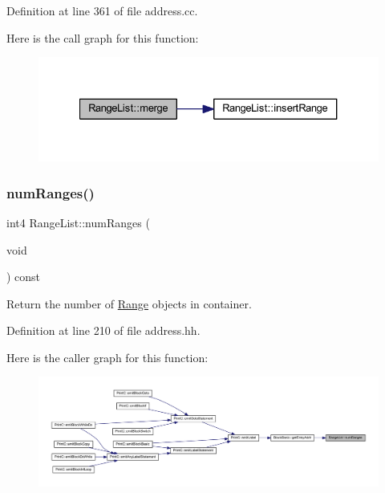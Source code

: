 Definition at line 361 of file address.\+cc.

Here is the call graph for this function\+:
\nopagebreak
\begin{figure}[H]
\begin{center}
\leavevmode
\includegraphics[width=327pt]{class_range_list_abdacecedb9b17b6a1b67f3f3d1d192e2_cgraph}
\end{center}
\end{figure}
\mbox{\label{class_range_list_a05df36bbb7206ca0cfb8b5a74fb1fb3d}} 
\subsubsection{\texorpdfstring{numRanges()}{numRanges()}}
{\footnotesize\ttfamily int4 Range\+List\+::num\+Ranges (\begin{DoxyParamCaption}\item[{void}]{ }\end{DoxyParamCaption}) const\hspace{0.3cm}{\ttfamily [inline]}}



Return the number of \mbox{\hyperlink{class_range}{Range}} objects in container. 



Definition at line 210 of file address.\+hh.

Here is the caller graph for this function\+:
\nopagebreak
\begin{figure}[H]
\begin{center}
\leavevmode
\includegraphics[width=350pt]{class_range_list_a05df36bbb7206ca0cfb8b5a74fb1fb3d_icgraph}
\end{center}
\end{figure}
\mbox{\label{class_range_list_ae9ed76aecdefbd58a4173fafb082a26c}} 
